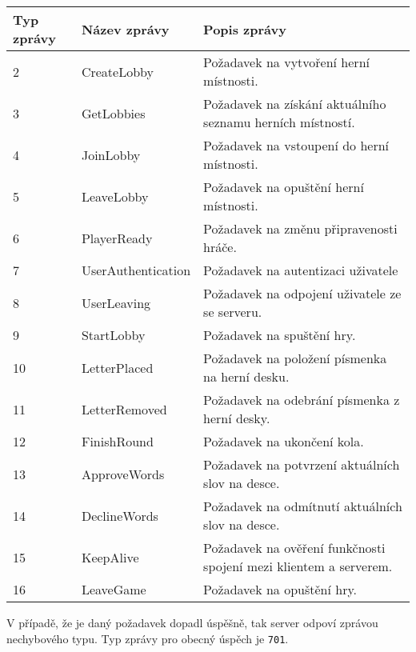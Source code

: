 \documentclass[12pt, a4paper]{article}
\begin{document}
\begin{center}
		\begin{tabular}{| p{1.2cm} | p{3.4cm} | p{7.830cm} |}
			\hline
			\textbf{Typ zprávy} & \textbf{Název zprávy} & \textbf{Popis zprávy} \\ 
			\hline
			2          &CreateLobby              &Požadavek na vytvoření herní místnosti.\\
			\hline
			3          &GetLobbies              &Požadavek na získání aktuálního seznamu herních místností.\\
			\hline
			4          &JoinLobby              &Požadavek na vstoupení do herní místnosti. \\
			\hline
			5          &LeaveLobby              &Požadavek na opuštění herní místnosti.\\
			\hline
			6          &PlayerReady              &Požadavek na změnu připravenosti hráče.\\
			\hline
			7          &UserAuthentication              &Požadavek na autentizaci uživatele\\
			\hline
			8          &UserLeaving              &Požadavek na odpojení uživatele ze se serveru.\\
			\hline
			9          &StartLobby              &Požadavek na spuštění hry.\\
			\hline
			10          &LetterPlaced              &Požadavek na položení písmenka na herní desku.\\
			\hline
			11          &LetterRemoved              &Požadavek na odebrání písmenka z herní desky.\\
			\hline
			12          &FinishRound              &Požadavek na ukončení kola.\\
			\hline
			13          &ApproveWords              &Požadavek na potvrzení aktuálních slov na desce.\\
			\hline
			14          &DeclineWords             &Požadavek na odmítnutí aktuálních slov na desce.\\
			\hline
			15          &KeepAlive              &Požadavek na ověření funkčnosti spojení mezi klientem a serverem.\\
			\hline
			16          &LeaveGame              &Požadavek na opuštění hry.\\
			\hline
		\end{tabular}
\end{center}  

		V případě, že je daný požadavek dopadl úspěšně, tak server odpoví zprávou nechybového typu. Typ zprávy pro obecný úspěch je \texttt{701}.
\end{document}
